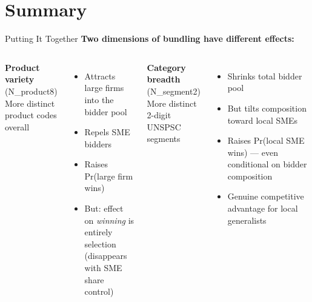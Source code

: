 \documentclass[9pt,aspectratio=169]{beamer}
\begin{document}
\section{Summary}

\begin{frame}{Putting It Together}
\textbf{Two dimensions of bundling have different effects:}

\bigskip
\begin{columns}[T]
  \textbf{Product variety} (N\_product8) \\[4pt]
  More distinct product codes overall
  \begin{itemize}
    \item Attracts large firms into the bidder pool
    \item Repels SME bidders
    \item Raises Pr(large firm wins)
    \item But: effect on \textit{winning} is entirely selection \\
          (disappears with SME share control)
  \end{itemize}

  \textbf{Category breadth} (N\_segment2) \\[4pt]
  More distinct 2-digit UNSPSC segments
  \begin{itemize}
    \item Shrinks total bidder pool
    \item But tilts composition toward local SMEs
    \item Raises Pr(local SME wins) --- even conditional on bidder composition
    \item Genuine competitive advantage for local generalists
  \end{itemize}
\end{columns}
\end{frame}
\end{document}
